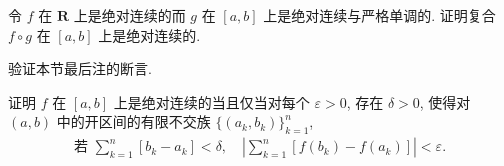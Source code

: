 \documentclass[../../main.tex]{subfiles}
\begin{document}
\begin{exercise}\label{exercise:ch06-45}
令 $f$ 在 $\mathbf{R}$ 上是绝对连续的而 $g$ 在 $[a,b]$ 上是绝对连续与严格单调的. 证明复合 $f\circ g$ 在 $[a,b]$ 上是绝对连续的.
\end{exercise}

\begin{exercise}\label{exercise:ch06-46}
验证本节最后注的断言.
\end{exercise}

\begin{exercise}\label{exercise:ch06-47}
证明 $f$ 在 $[a,b]$ 上是绝对连续的当且仅当对每个 $\varepsilon>0$, 存在 $\delta>0$, 使得对 $(a,b)$ 中的开区间的有限不交族 $\{(a_{k},b_{k})\}_{k=1}^{n}$,
\begin{align*}
\text{若 }\sum_{k=1}^{n}[b_{k}-a_{k}]<\delta,\quad\left|\sum_{k=1}^{n}[f(b_{k})-f(a_{k})]\right|<\varepsilon.
\end{align*}
\end{exercise}
\end{document}
